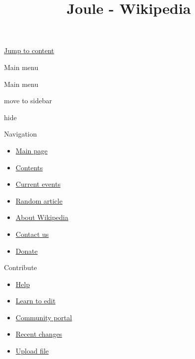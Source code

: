\documentclass[
]{article}
\title{Joule - Wikipedia}
\author{}
\date{}
\providecommand{\tightlist}{%
  \setlength{\itemsep}{0pt}\setlength{\parskip}{0pt}}
\begin{document}
\maketitle

\hyperref[bodyContent]{Jump to content}

\label{vector-main-menu-dropdown}
{} {Main menu}

\label{vector-main-menu-unpinned-container}
\label{vector-main-menu}
Main menu

move to sidebar

hide

\label{p-navigation}
Navigation

\begin{itemize}
\tightlist
\item
  \label{n-mainpage-description}{\href{/wiki/Main_Page}{{Main
  page}}}
\item
  \label{n-contents}{\href{/wiki/Wikipedia:Contents}{{Contents}}}
\item
  \label{n-currentevents}{\href{/wiki/Portal:Current_events}{{Current
  events}}}
\item
  \label{n-randompage}{\href{/wiki/Special:Random}{{Random
  article}}}
\item
  \label{n-aboutsite}{\href{/wiki/Wikipedia:About}{{About
  Wikipedia}}}
\item
  \label{n-contactpage}{\href{//en.wikipedia.org/wiki/Wikipedia:Contact_us}{{Contact
  us}}}
\item
  \label{n-sitesupport}{\href{https://donate.wikimedia.org/wiki/Special:FundraiserRedirector?utm_source=donate&utm_medium=sidebar&utm_campaign=C13_en.wikipedia.org&uselang=en}{{Donate}}}
\end{itemize}

\label{p-interaction}
Contribute

\begin{itemize}
\tightlist
\item
  \label{n-help}{\href{/wiki/Help:Contents}{{Help}}}
\item
  \label{n-introduction}{\href{/wiki/Help:Introduction}{{Learn
  to edit}}}
\item
  \label{n-portal}{\href{/wiki/Wikipedia:Community_portal}{{Community
  portal}}}
\item
  \label{n-recentchanges}{\href{/wiki/Special:RecentChanges}{{Recent
  changes}}}
\item
  \label{n-upload}{\href{/wiki/Wikipedia:File_upload_wizard}{{Upload
  file}}}
\end{itemize}
\end{document}
